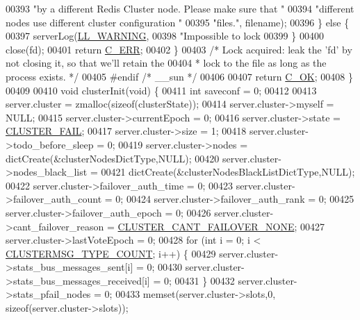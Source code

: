 \begin{DoxyCode}
{{{{{{00393                  \textcolor{stringliteral}{"by a different Redis Cluster node. Please make sure that "}
00394                  \textcolor{stringliteral}{"different nodes use different cluster configuration "}
00395                  \textcolor{stringliteral}{"files."}, filename);
00396         \} \textcolor{keywordflow}{else} \{
00397             serverLog(\hyperlink{server_8h_a31229b9334bba7d6be2a72970967a14b}{LL\_WARNING},
00398                 \textcolor{stringliteral}{"Impossible to lock %
00399         \}
00400         close(fd);
00401         \textcolor{keywordflow}{return} \hyperlink{server_8h_af98ac28d5f4d23d7ed5985188e6fb7d1}{C\_ERR};
00402     \}
00403     \textcolor{comment}{/* Lock acquired: leak the 'fd' by not closing it, so that we'll retain the}
00404 \textcolor{comment}{     * lock to the file as long as the process exists. */}
00405 \textcolor{preprocessor}{#}\textcolor{preprocessor}{endif} \textcolor{comment}{/* \_\_sun */}
00406 
00407     \textcolor{keywordflow}{return} \hyperlink{server_8h_a303769ef1065076e68731584e758d3e1}{C\_OK};
00408 \}
00409 
00410 \textcolor{keywordtype}{void} clusterInit(\textcolor{keywordtype}{void}) \{
00411     \textcolor{keywordtype}{int} saveconf = 0;
00412 
00413     server.cluster = zmalloc(\textcolor{keyword}{sizeof}(clusterState));
00414     server.cluster->myself = NULL;
00415     server.cluster->currentEpoch = 0;
00416     server.cluster->state = \hyperlink{cluster_8h_a4a46e6d5b85c594d08283dc6da2a32bf}{CLUSTER\_FAIL};
00417     server.cluster->size = 1;
00418     server.cluster->todo\_before\_sleep = 0;
00419     server.cluster->nodes = dictCreate(&clusterNodesDictType,NULL);
00420     server.cluster->nodes\_black\_list =
00421         dictCreate(&clusterNodesBlackListDictType,NULL);
00422     server.cluster->failover\_auth\_time = 0;
00423     server.cluster->failover\_auth\_count = 0;
00424     server.cluster->failover\_auth\_rank = 0;
00425     server.cluster->failover\_auth\_epoch = 0;
00426     server.cluster->cant\_failover\_reason = \hyperlink{cluster_8h_a9a55c4c18a5113bc3c8272f62a983c96}{CLUSTER\_CANT\_FAILOVER\_NONE};
00427     server.cluster->lastVoteEpoch = 0;
00428     \textcolor{keywordflow}{for} (\textcolor{keywordtype}{int} i = 0; i < \hyperlink{cluster_8h_a6222c464c1f2125f42271d2abd63853e}{CLUSTERMSG\_TYPE\_COUNT}; i++) \{
00429         server.cluster->stats\_bus\_messages\_sent[i] = 0;
00430         server.cluster->stats\_bus\_messages\_received[i] = 0;
00431     \}
00432     server.cluster->stats\_pfail\_nodes = 0;
00433     memset(server.cluster->slots,0, \textcolor{keyword}{sizeof}(server.cluster->slots));
}}}}}}}
\end{DoxyCode}
